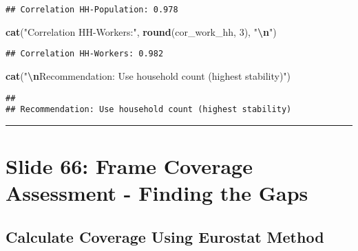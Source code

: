 \documentclass[
]{article}
\newenvironment{Shaded}{\begin{snugshade}}{\end{snugshade}}
\newcommand{\DecValTok}[1]{\textcolor[rgb]{0.00,0.00,0.81}{#1}}
\newcommand{\FunctionTok}[1]{\textcolor[rgb]{0.13,0.29,0.53}{\textbf{#1}}}
\newcommand{\NormalTok}[1]{#1}
\newcommand{\SpecialCharTok}[1]{\textcolor[rgb]{0.81,0.36,0.00}{\textbf{#1}}}
\newcommand{\StringTok}[1]{\textcolor[rgb]{0.31,0.60,0.02}{#1}}
\begin{document}
\begin{verbatim}
## Correlation HH-Population: 0.978
\end{verbatim}

\begin{Shaded}
\begin{Highlighting}[]
\FunctionTok{cat}\NormalTok{(}\StringTok{"Correlation HH{-}Workers:"}\NormalTok{, }\FunctionTok{round}\NormalTok{(cor\_work\_hh, }\DecValTok{3}\NormalTok{), }\StringTok{"}\SpecialCharTok{\textbackslash{}n}\StringTok{"}\NormalTok{)}
\end{Highlighting}
\end{Shaded}

\begin{verbatim}
## Correlation HH-Workers: 0.982
\end{verbatim}

\begin{Shaded}
\begin{Highlighting}[]
\FunctionTok{cat}\NormalTok{(}\StringTok{"}\SpecialCharTok{\textbackslash{}n}\StringTok{Recommendation: Use household count (highest stability)"}\NormalTok{)}
\end{Highlighting}
\end{Shaded}

\begin{verbatim}
## 
## Recommendation: Use household count (highest stability)
\end{verbatim}

\begin{center}\rule{0.5\linewidth}{0.5pt}\end{center}

\section{Slide 66: Frame Coverage Assessment - Finding the
Gaps}\label{slide-66-frame-coverage-assessment---finding-the-gaps}

\subsection{Calculate Coverage Using Eurostat
Method}\label{calculate-coverage-using-eurostat-method}
\end{document}
